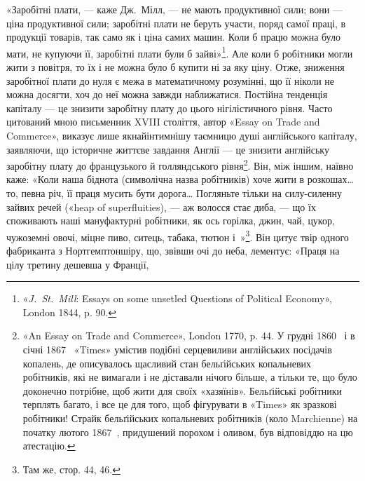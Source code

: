 «Заробітні плати, — каже Дж.~Мілл, — не мають продуктивної
сили; вони — ціна продуктивної сили; заробітні плати не
беруть участи, поряд самої праці, в продукції товарів, так само
як і ціна самих машин. Коли б працю можна було мати, не купуючи
її, заробітні плати були б зайві»\footnote{
«\emph{J.~St.~Mill}: Essays on some unsetled Questions of Political Economy»,
London 1844, p. 90.
}. Але коли б робітники
могли жити з повітря, то їх і не можна було б купити ні за яку ціну.
Отже, зниження заробітної плати до нуля є межа в математичному
розумінні, що її ніколи не можна досягти, хоч до неї можна
завжди наближатися. Постійна тенденція капіталу — це знизити
заробітну плату до цього нігілістичного рівня. Часто цитований
мною письменник XVIII століття, автор «Essay on Trade and
Commerce», виказує лише якнайінтимнішу таємницю душі англійського
капіталу, заявляючи, що історичне життєве завдання
Англії — це знизити англійську заробітну плату до французького
й голляндського рівня\footnote{
«An Essay on Trade and Commerce», London 1770, p. 44. У грудні
1860~ і в січні 1867~ «Times» умістив подібні серцевиливи англійських
посідачів копалень, де описувалось щасливий стан бельґійських
копальневих робітників, які не вимагали і не діставали нічого більше,
а тільки те, що було доконечно потрібне, щоб жити для своїх «хазяїнів».
Бельґійські робітники терплять багато, і все це для того, щоб фігурувати
в «Times» як зразкові робітники! Страйк бельґійських копальневих
робітників (коло Marchienne) на початку лютого 1867~, придушений
порохом і оливом, був відповіддю на цю атестацію.
}. Він, між іншим, наївно каже: «Коли
наша біднота (символічна назва робітників) хоче жити в розкошах\dots{}
то, певна річ, її праця мусить бути дорога\dots{} Погляньте
тільки на силу-силенну зайвих речей («heap of superfluities), —
аж волосся стає диба, — що їх споживають наші мануфактурні
робітники, як ось горілка, джин, чай, цукор, чужоземні
овочі, міцне пиво, ситець, табака, тютюн і~»\footnote{
Там же, стор. 44, 46.
}. Він цитує
твір одного фабриканта з Нортгемптоншіру, що, звівши очі до
неба, лементує: «Праця на цілу третину дешевша у Франції,
\enlargethispage{\baselineskip}
\parbreak{}  %
